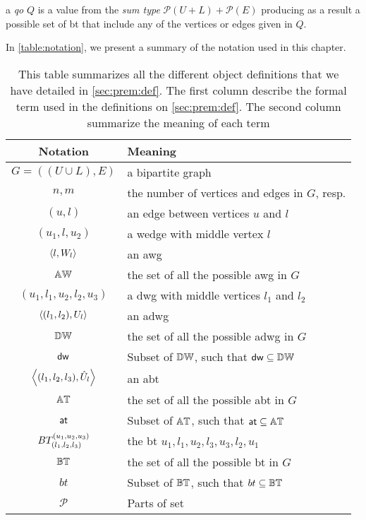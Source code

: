 \begin{definition}[\acrfull{qo}]\label{def:query:match} 
a \emph{\acrlong{qo}} $Q$ is a value from the  \textit{sum type}
$\mathcal{P}(U + L) + \mathcal{P}(E)$ producing as a result a possible set of \acrshort{bt} that include any of the vertices or edges given in $Q$.
\end{definition}

In \autoref{table:notation}, we present a summary of the notation used in this chapter.

\begin{table}[!ht]
\centering
\begin{tabular}{|c|l|} \hline
\textbf{Notation} & \textbf{Meaning}\\ \hline
$G=((U\cup L),E)$ & a bipartite graph\\  \hline
$n,m$ & the number of vertices and edges in $G$, resp.\\  \hline
$(u,l)$ & an edge between vertices $u$ and $l$\\  \hline
$(u_1,l,u_2)$ & a wedge with  middle vertex $l$\\  \hline
$\left\langle l, W_l \right\rangle$ & an \acrshort{awg}\\  \hline
$\mathbb{AW}$ & the set of all the possible \acrshort{awg} in $G$\\  \hline
$(u_1,l_1,u_2,l_2,u_3)$ & a \acrshort{dwg} with middle vertices $l_1$ and $l_2$\\  \hline 
$\left\langle (l_1, l_2), U_l \right\rangle$ & an \acrshort{adwg}\\  \hline
$\mathbb{DW}$ & the set of all the possible \acrshort{adwg} in $G$\\  \hline
$\mathsf{dw}$ & Subset of $\mathbb{DW}$, such that $\mathsf{dw} \subseteq \mathbb{DW}$ \\  \hline
$\left\langle (l_1, l_2,l_3), \hat{U}_l \right\rangle$ & an \acrshort{abt}\\  \hline
$\mathbb{AT}$ & the set of all the possible \acrshort{abt} in $G$ \\  \hline
$\mathsf{at}$ & Subset of $\mathbb{AT}$, such that $\mathsf{at} \subseteq \mathbb{AT}$ \\  \hline 
$BT_{(l_1, l_2,l_3)}^{(u_1, u_2, u_3)}$ & the \acrshort{bt} $u_1,l_1,u_2,l_3,u_3,l_2,u_1$\\  \hline
$\mathbb{BT}$ & the set of all the possible \acrshort{bt} in $G$ \\  \hline
$bt$ & Subset of $\mathbb{BT}$, such that $bt \subseteq \mathbb{BT}$ \\  \hline
$\mathcal{P}$ & Parts of set \\  \hline
\end{tabular}
\caption[{[\acrshort{iebt}] Summary of notations and their meanings}]{This table summarizes all the different object definitions that we have detailed in \autoref{sec:prem:def}. The first column describe the formal term used in the definitions on \autoref{sec:prem:def}. The second column summarize the meaning of each term}
\label{table:notation}
\end{table}
      
